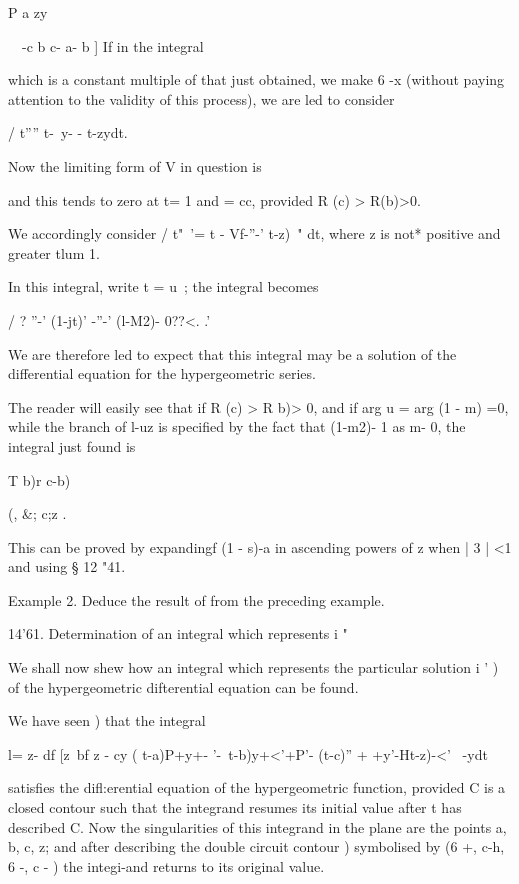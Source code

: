 P a zy

\ \ -c b c- a- b ] If in the integral

which is a constant multiple of that just obtained, we make 6 -x
(without paying attention to the validity of this process), we are led
to consider

/ t'''' t-\ y- - t-zydt.

Now the limiting form of V in question is

and this tends to zero at t= 1 and = cc, provided R (c) > R(b)>0.

We accordingly consider / t"~'= t - Vf-''-' t-z)~" dt, where z is not*
positive and greater tlum 1.

In this integral, write t = u~; the integral becomes

/ ? ''-' (1-jt)' -''-' (l-M2)- 0??<. .'

We are therefore led to expect that this integral may be a solution of
the differential equation for the hypergeometric series.

The reader will easily see that if R (c) > R b)> 0, and if arg u = arg
(1 - m) =0, while the branch of l-uz is specified by the fact that
(1-m2)- 1 as m- 0, the integral just found is

T b)r c-b)

  (, \&; c;z .

This can be proved by expandingf (1 - s)-a in ascending powers of z
when | 3 | <1 and using § 12 "41.

Example 2. Deduce the result of from the preceding example.

14'61. Determination of an integral which represents i "\

We shall now shew how an integral which represents the particular
solution i ' ) of the hypergeometric difterential equation can
be found.

We have seen ) that the integral

l= z- df [z~bf z - cy ( t-a)P+y+- '-\ t-b)y+<'+P'- (t-c)'' +
+y'-Ht-z)-<'~ -ydt

satisfies the difl:erential equation of the hypergeometric function,
provided C is a closed contour such that the integrand resumes its
initial value after t has described C. Now the singularities of this
integrand in the plane are the points a, b, c, z; and after describing
the double circuit contour ) symbolised by (6 +, c-h, 6 -, c
- ) the integi-and returns to its original value.

